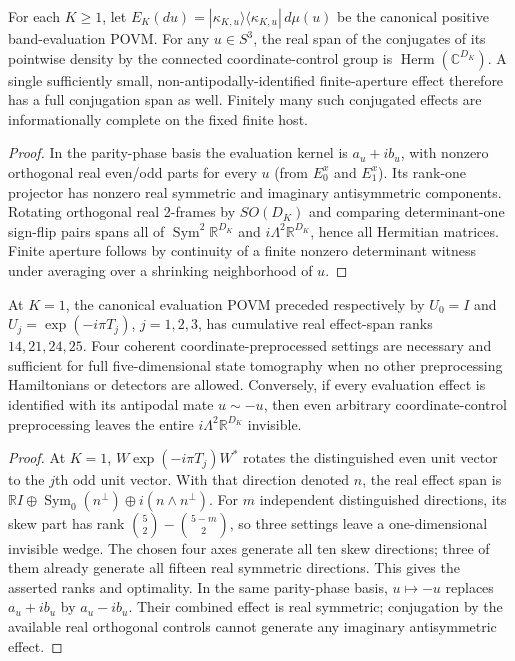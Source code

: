 \documentclass[12pt,a4paper]{article}
\begin{document}
\begin{corollary}
\label{p4a:cor:finite-coordinate-controlled-tomography}
For each $K\ge1$, let $E_K(du)=|\kappa_{K,u}\rangle
\langle\kappa_{K,u}|\,d\mu(u)$ be the canonical positive
band-evaluation POVM. For any $u\in S^3$, the real span of the conjugates
of its pointwise density by the connected coordinate-control group
is $\operatorname{Herm}(\mathbb C^{D_K})$. A single sufficiently small,
non-antipodally-identified finite-aperture effect therefore has a full
conjugation span as well. Finitely many such conjugated effects are
informationally complete on the fixed finite host.
\end{corollary}
\begin{proof}
In the parity-phase basis the evaluation kernel is $a_u+i b_u$,
with nonzero orthogonal real even/odd parts for every $u$ (from
$E_0^x$ and $E_1^x$). Its rank-one projector has nonzero real symmetric
and imaginary antisymmetric components. Rotating orthogonal real
2-frames by $SO(D_K)$ and comparing determinant-one sign-flip pairs
spans all of $\operatorname{Sym}^2\mathbb R^{D_K}$ and
$i\Lambda^2\mathbb R^{D_K}$, hence all Hermitian matrices.
Finite aperture follows by continuity of a finite nonzero determinant
witness under averaging over a shrinking neighborhood of $u$.
\end{proof}

\begin{corollary}
\label{p4a:cor:primitive-four-setting-coordinate-tomography}
At $K=1$, the canonical evaluation POVM preceded respectively by
$U_0=I$ and $U_j=\exp(-i\pi T_j)$, $j=1,2,3$, has cumulative real
effect-span ranks $14,21,24,25$. Four coherent coordinate-preprocessed
settings are necessary and sufficient for full five-dimensional
state tomography when no other preprocessing Hamiltonians or detectors
are allowed. Conversely, if every evaluation effect is identified
with its antipodal mate $u\sim-u$, then even arbitrary coordinate-control
preprocessing leaves the entire $i\Lambda^2\mathbb R^{D_K}$ invisible.
\end{corollary}
\begin{proof}
At $K=1$, $W\exp(-i\pi T_j)W^*$ rotates the distinguished even unit
vector to the $j$th odd unit vector. With that direction denoted $n$,
the real effect span is
$\mathbb RI\oplus\operatorname{Sym}_0(n^\perp)
\oplus i(n\wedge n^\perp)$.
For $m$ independent distinguished directions, its skew part has rank
$\binom52-\binom{5-m}{2}$, so three settings leave a one-dimensional
invisible wedge. The chosen four axes generate all ten skew directions;
three of them already generate all fifteen real symmetric directions.
This gives the asserted ranks and optimality.
In the same parity-phase basis, $u\mapsto-u$ replaces
$a_u+ib_u$ by $a_u-ib_u$. Their combined effect is real symmetric;
conjugation by the available real orthogonal controls cannot generate
any imaginary antisymmetric effect.
\end{proof}
\end{document}
